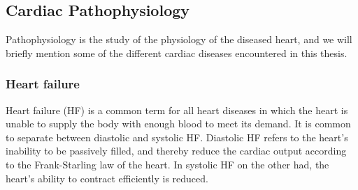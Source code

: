 



\subsection{Cardiac Pathophysiology}
Pathophysiology is the study of the physiology of the diseased heart,
and we will briefly mention some of the different cardiac diseases
encountered in this thesis. 


\subsubsection{Heart failure}
Heart failure (HF) is a common term for all heart diseases in which the
heart is unable to supply the body with enough blood to meet its
demand. It is common to separate between diastolic and systolic HF.
Diastolic HF refers to the heart's inability to be passively
filled, and thereby reduce the cardiac output according to the 
Frank-Starling law of the heart. In systolic HF on the other had, the
heart's ability to contract efficiently is reduced.

